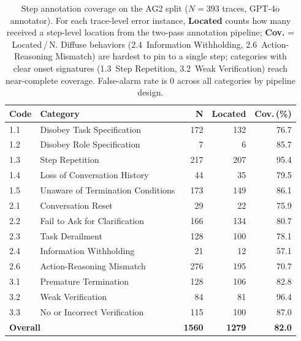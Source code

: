 
%

\begin{table}[t]
    \centering
    \small
    \setlength{\tabcolsep}{5pt}
    \renewcommand{\arraystretch}{1.15}
    \begin{tabular}{l l r r r}
    \toprule
    \textbf{Code} & \textbf{Category} & \textbf{N} & \textbf{Located} & \textbf{Cov.\,(\%)} \\
    \midrule
    1.1 & Disobey Task Specification       & 172 & 132 & 76.7 \\
    1.2 & Disobey Role Specification       &   7 &   6 & 85.7 \\
    1.3 & Step Repetition                  & 217 & 207 & 95.4 \\
    1.4 & Loss of Conversation History     &  44 &  35 & 79.5 \\
    1.5 & Unaware of Termination Conditions& 173 & 149 & 86.1 \\
    \midrule
    2.1 & Conversation Reset               &  29 &  22 & 75.9 \\
    2.2 & Fail to Ask for Clarification    & 166 & 134 & 80.7 \\
    2.3 & Task Derailment                  & 128 & 100 & 78.1 \\
    2.4 & Information Withholding          &  21 &  12 & 57.1 \\
    2.6 & Action-Reasoning Mismatch        & 276 & 195 & 70.7 \\
    \midrule
    3.1 & Premature Termination            & 128 & 106 & 82.8 \\
    3.2 & Weak Verification                &  84 &  81 & 96.4 \\
    3.3 & No or Incorrect Verification     & 115 & 100 & 87.0 \\
    \midrule
    \multicolumn{2}{l}{\textbf{Overall}} & \textbf{1560} & \textbf{1279} & \textbf{82.0} \\
    \bottomrule
    \end{tabular}
    \caption{%
      Step annotation coverage on the AG2 split ($N{=}393$ traces, GPT-4o annotator).
      For each trace-level error instance, \textbf{Located} counts how many received
      a step-level location from the two-pass annotation pipeline;
      \textbf{Cov.} = Located\,/\,N.
      Diffuse behaviors (2.4~Information Withholding, 2.6~Action-Reasoning Mismatch)
      are hardest to pin to a single step; categories with clear onset signatures
      (1.3~Step Repetition, 3.2~Weak Verification) reach near-complete coverage.
      False-alarm rate is 0 across all categories by pipeline design.%
    }
    \label{tab:step_annotation}
    \end{table}
    